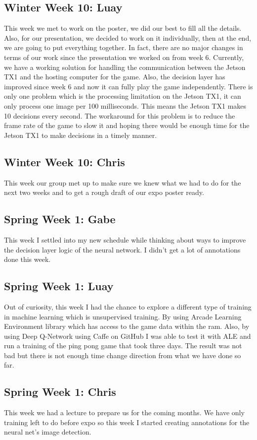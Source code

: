 \documentclass[onecolumn, draftclsnofoot,10pt, compsoc]{IEEEtran}
\begin{document}
\subsection{Winter Week 10: Luay}
This week we met to work on the poster, we did our best to fill all the details. Also, for our presentation, we decided to work on it individually, then at the end, we are going to put everything together. In fact, there are no major changes in terms of our work since the presentation we worked on from week 6. Currently, we have a working solution for handling the communication between the Jetson TX1 and the hosting computer for the game. Also, the decision layer has improved since week 6 and now it can fully play the game independently. There is only one problem which is the processing limitation on the Jetson TX1, it can only process one image per 100 milliseconds. This means the Jetson TX1 makes 10 decisions every second. The workaround for this problem is to reduce the frame rate of the game to slow it and hoping there would be enough time for the Jetson TX1 to make decisions in a timely manner.
\subsection{Winter Week 10: Chris}
This week our group met up to make sure we knew what we had to do for the next two weeks and to get a rough draft of our expo poster ready.
\subsection{Spring Week 1: Gabe}
This week I settled into my new schedule while thinking about ways to improve the decision layer logic of the neural network. I didn't get a lot of annotations done this week.
\subsection{Spring Week 1: Luay}
Out of curiosity, this week I had the chance to explore a different type of training in machine learning which is unsupervised training. By using Arcade Learning Environment library which has access to the game data within the ram. Also, by using Deep Q-Network using Caffe on GitHub I was able to test it with ALE and run a training of the ping pong game that took three days. The result was not bad but there is not enough time change direction from what we have done so far.
\subsection{Spring Week 1: Chris}
This week we had a lecture to prepare us for the coming months. We have only training left to do before expo so this week I started creating annotations for the neural net's image detection.
\end{document}
